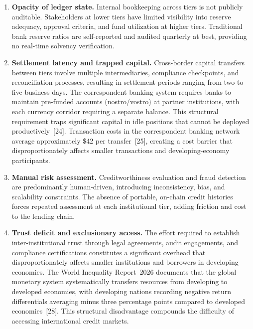 \documentclass[12pt,a4paper]{report}
\begin{document}
\begin{enumerate}[noitemsep]
\item \textbf{Opacity of ledger state.} Internal bookkeeping across tiers is not publicly auditable. Stakeholders at lower tiers have limited visibility into reserve adequacy, approval criteria, and fund utilization at higher tiers. Traditional bank reserve ratios are self-reported and audited quarterly at best, providing no real-time solvency verification.

\item \textbf{Settlement latency and trapped capital.} Cross-border capital transfers between tiers involve multiple intermediaries, compliance checkpoints, and reconciliation processes, resulting in settlement periods ranging from two to five business days. The correspondent banking system requires banks to maintain pre-funded accounts (nostro/vostro) at partner institutions, with each currency corridor requiring a separate balance. This structural requirement traps significant capital in idle positions that cannot be deployed productively~[24]. Transaction costs in the correspondent banking network average approximately \$42 per transfer~[25], creating a cost barrier that disproportionately affects smaller transactions and developing-economy participants.

\item \textbf{Manual risk assessment.} Creditworthiness evaluation and fraud detection are predominantly human-driven, introducing inconsistency, bias, and scalability constraints. The absence of portable, on-chain credit histories forces repeated assessment at each institutional tier, adding friction and cost to the lending chain.

\item \textbf{Trust deficit and exclusionary access.} The effort required to establish inter-institutional trust through legal agreements, audit engagements, and compliance certifications constitutes a significant overhead that disproportionately affects smaller institutions and borrowers in developing economies. The World Inequality Report~2026 documents that the global monetary system systematically transfers resources from developing to developed economies, with developing nations recording negative return differentials averaging minus three percentage points compared to developed economies~[28]. This structural disadvantage compounds the difficulty of accessing international credit markets.
\end{enumerate}
\end{document}
